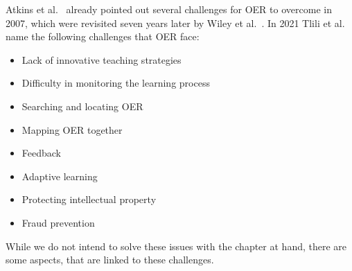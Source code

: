 Atkins et al.~\cite{atkins:2007:review} already pointed out several challenges for OER to overcome in 2007, which were revisited seven years later by Wiley et al.~\cite{wiley:2014:oer}. In 2021  Tlili et al.~\cite{tlili:2021:towards} name the following challenges that OER face:
\begin{itemize}
	\item Lack of innovative teaching strategies
	\item Difficulty in monitoring the learning process
	\item Searching and locating OER
	\item Mapping OER together
	\item Feedback
	\item Adaptive learning
	\item Protecting intellectual property
	\item Fraud prevention
\end{itemize}

While we do not intend to solve these issues with the chapter at hand, there are some aspects, that are linked to these challenges.

